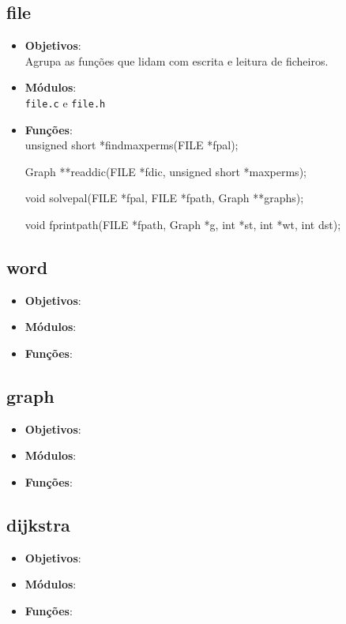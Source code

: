 \documentclass[portuguese, a4paper]{article}
\newcommand\tu[0]{\textunderscore}
\begin{document}
	\subsection{file}
	\begin{itemize}
		\item \textbf{Objetivos}: \\
		Agrupa as funções que lidam com escrita e leitura de ficheiros.

		\item \textbf{Módulos}: \\
		\texttt{file.c} e \texttt{file.h}

		\item \textbf{Funções}: \\
		unsigned short *find\tu max\tu perms(FILE *fpal);

		Graph **read\tu dic(FILE *fdic, unsigned short *max\tu perms);

		void solve\tu pal(FILE *fpal, FILE *fpath, Graph **graphs);

		void fprint\tu path(FILE *fpath, Graph *g, int *st, int *wt, int dst);
	\end{itemize}

	\subsection{word}
	\begin{itemize}
		\item \textbf{Objetivos}: \\

		\item \textbf{Módulos}: \\
		\item \textbf{Funções}: \\
	\end{itemize}

	\subsection{graph}
	\begin{itemize}
		\item \textbf{Objetivos}: \\
		\item \textbf{Módulos}: \\
		\item \textbf{Funções}: \\
	\end{itemize}

	\subsection{dijkstra}
	\begin{itemize}
		\item \textbf{Objetivos}: \\
		\item \textbf{Módulos}: \\
		\item \textbf{Funções}: \\
	\end{itemize}
\end{document}

